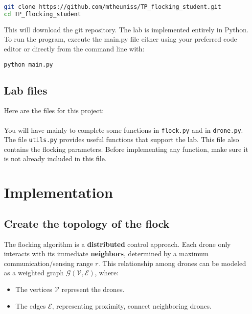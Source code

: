 \documentclass{article}
\begin{document}
\begin{lstlisting}[language=bash, frame=single]
git clone https://github.com/mtheuniss/TP_flocking_student.git
cd TP_flocking_student
\end{lstlisting}

This will download the git repository. The lab is implemented entirely in Python. To run the program, execute the main.py file either using your preferred code editor or directly from the command line with:

\begin{lstlisting}[frame=single]
python main.py
\end{lstlisting}

\subsection{Lab files}


Here are the files for this project:

\begin{minipage}{.4\linewidth}
\end{minipage}
\paragraph{}
You will have mainly to complete some functions in \texttt{flock.py} and in \texttt{drone.py}. The file \texttt{utils.py} provides useful functions that support the lab. This file also contains the flocking parameters. Before implementing any function, make sure it is not already included in this file. 

\section{Implementation}

\subsection{Create the topology of the flock}
The flocking algorithm is a \textbf{distributed} control approach. Each drone only interacts with its immediate \textbf{neighbors}, determined by a maximum communication/sensing range $r$. This relationship among drones can be modeled as a weighted graph $\mathcal{G}(\mathcal{V}, \mathcal{E})$, where:
\begin{itemize}
 \item The vertices $\mathcal{V}$ represent the drones.
 \item The edges $\mathcal{E}$, representing proximity, connect neighboring drones.
\end{itemize}
\end{document}
